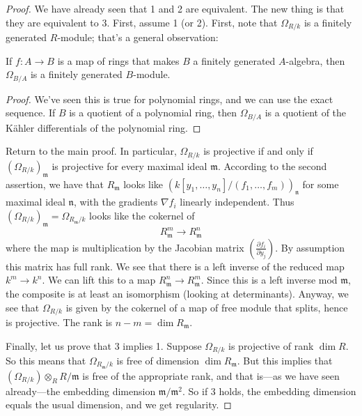 \begin{proof} 
We have already seen that 1 and 2 are equivalent. The new thing is that they
are equivalent to 3. First, assume 1 (or 2). 
First, note that $\Omega_{R/k}$ is a finitely generated $R$-module; that's a general
observation:

\begin{proposition} 
\label{finitelygeneratedOmega}
If $f: A \to B$ is a map of rings that makes $B$ a finitely generated $A$-algebra, then
$\Omega_{B/A}$ is a finitely generated $B$-module.
\end{proposition} 
\begin{proof} 
We've seen this is true for polynomial rings, and we can use the exact
sequence. If $B$ is a quotient of a polynomial ring, then $\Omega_{B/A}$ is a
quotient of the K\"ahler differentials of the polynomial ring.
\end{proof} 
Return to the main proof. In particular, $\Omega_{R/k}$ is projective if and
only if $(\Omega_{R/k})_{\mathfrak{m}}$ is projective for every maximal ideal
$\mathfrak{m}$.  According to the second assertion, we have that
$R_{\mathfrak{m}}$ looks like $(k[y_1, \dots, y_n]/(f_1, \dots,
f_m))_{\mathfrak{n}}$ for some maximal ideal $\mathfrak{n}$, with the
gradients $\nabla f_i$ linearly independent. Thus
$(\Omega_{R/k})_{\mathfrak{m}} = \Omega_{R_{\mathfrak{m}}/k}$ looks like the cokernel of 
\[ R_{\mathfrak{m}}^m \to R_{\mathfrak{m}}^n  \]
where the map is multiplication by the Jacobian matrix $\left(\frac{\partial
f_i}{\partial y_j}  \right)$. By assumption this matrix has full rank. We see
that there is a left inverse of the reduced  map $k^m \to k^n$. 
We can lift this to a map $R_{\mathfrak{m}}^n \to R_{\mathfrak{m}}^m$. Since
this is a left inverse mod $\mathfrak{m}$, the composite is at least an
isomorphism (looking at determinants). Anyway, we see that $\Omega_{R/k}$ is
given by the cokernel of a map of free module that splits, hence is projective.
The rank is $n-m = \dim R_{\mathfrak{m}}$.

Finally, let us prove that 3 implies 1. Suppose $\Omega_{R/k}$ is projective of
rank $\dim R$. So this means that $\Omega_{R_{\mathfrak{m}}/k}$ is free of
dimension $\dim R_{\mathfrak{m}}$. But this implies that $(\Omega_{R/k})
\otimes_R R/\mathfrak{m}$ is free of the appropriate rank, and that is---as we
have seen already---the embedding dimension $\mathfrak{m}/\mathfrak{m}^2$. So
if 3 holds, the embedding dimension equals the usual dimension, and we get
regularity.
\end{proof} 

